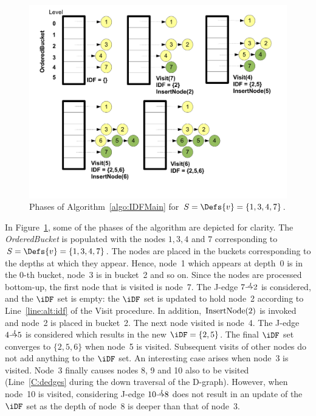 {\begin{figure}[htb]
    \centerline{\includegraphics[scale=0.3]{sreedhargao.pdf}}
    \caption{Phases of Algorithm~\ref{algo:IDFMain} for $S=\Defs{v}=\{1,3,4,7\}$.}
    \label{fig:sreedhargao}
    \end{figure} 


In Figure~\ref{fig:sreedhargao}, some of the phases of the algorithm are depicted for clarity. 
The \textit{OrderedBucket} is populated with the nodes $1,3,4$ and $7$ corresponding to $S=\Defs{v}=\{1,3,4,7\}$. 
The nodes are placed in the buckets corresponding to the depths at which they appear. 
Hence, node~1 which appears at depth~0 is in the 0-th bucket, node~3 is in bucket~2 and so on. 
Since the nodes are processed bottom-up, the first node that is visited is node~7. 
The J-edge $7 \st{J} 2$ is considered, and the $\iDF$ set is empty: the $\iDF$ 
set is updated to hold node~2 according to Line~\ref{line:alt:idf} of the Visit 
procedure.  In addition, $\textrm{InsertNode}(2)$ is invoked and node~2 is placed in 
bucket~2.  The next node visited is node~4.  The J-edge $4 \st{J} 5$ is 
considered which results in the new $\iDF = \{2,5\}$.  The final $\iDF$ set 
converges to $\{2,5,6\}$ when node~5 is visited.  Subsequent visits of other 
nodes do not add anything to the $\iDF$ set.  An interesting case arises when 
node~3 is visited.  Node~3 finally causes nodes 8, 9 and 10 also to be visited 
(Line~\ref{C:dedges} during the down traversal of the D-graph).  However, when 
node~10 is visited, considering J-edge $10 \st{J} 8$ does not result in an 
update of the $\iDF$ set as the depth of node~8 is deeper than that of node~3.


}
